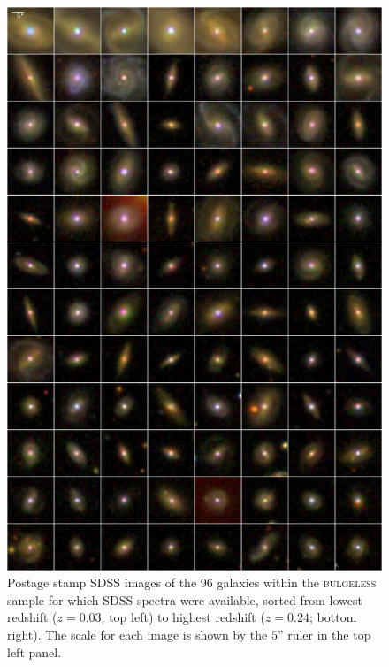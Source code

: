 \begin{figure}
\centering
\includegraphics[height=0.9\textheight]{agn/mosaic_all_diskdom_zsort.pdf}
\caption[SDSS images of \textsc{bulgeless} sample]{Postage stamp SDSS images of the $96$ galaxies within the \textsc{bulgeless} sample for which SDSS spectra were available, sorted from lowest redshift ($z=0.03$; top left) to highest redshift ($z=0.24$; bottom right). The scale for each image is shown by the $5$'' ruler in the top left panel.}
\label{fig:exampleimages}
\end{figure}


